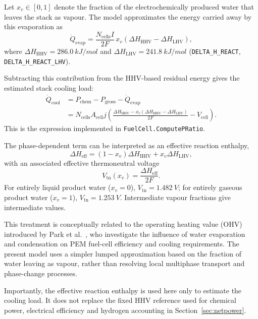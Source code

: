 \documentclass[a4paper,11pt]{article}
\newcommand{\code}[1]{\nolinkurl{#1}}
\newcommand{\fn}[1]{\nolinkurl{#1}}
\begin{document}
Let $x_v\in[0,1]$ denote the fraction of the electrochemically
produced water that leaves the stack as vapour. The model approximates
the energy carried away by this evaporation as
\begin{equation}
  \dot Q_\mathrm{evap}
  = \frac{N_\mathrm{cells}I}{2F}\,x_v
    \left(\Delta H_\mathrm{HHV}-\Delta H_\mathrm{LHV}\right),
\end{equation}
where $\Delta H_\mathrm{HHV}=\SI{286.0}{kJ/mol}$ and
$\Delta H_\mathrm{LHV}=\SI{241.8}{kJ/mol}$
(\code{DELTA_H_REACT}, \code{DELTA_H_REACT_LHV}).

Subtracting this contribution from the HHV-based residual energy
gives the estimated stack cooling load:
\begin{equation}
  \begin{aligned}
    \dot Q_\mathrm{cool}
    &= P_\mathrm{chem}-P_\mathrm{gross}-\dot Q_\mathrm{evap} \\
    &= N_\mathrm{cells} A_\mathrm{cell} j
    \left(
      \frac{\Delta H_\mathrm{HHV}
        -x_v(\Delta H_\mathrm{HHV}-\Delta H_\mathrm{LHV})}{2F}
      -V_\mathrm{cell}
    \right).
  \end{aligned}
  \label{eq:qcool}
\end{equation}
This is the expression implemented in \fn{FuelCell.ComputePRatio}.

The phase-dependent term can be interpreted as an effective
reaction enthalpy,
\begin{equation}
  \Delta H_\mathrm{eff}
  = (1-x_v)\Delta H_\mathrm{HHV}
    +x_v\Delta H_\mathrm{LHV},
\end{equation}
with an associated effective thermoneutral voltage
\begin{equation}
  V_\mathrm{tn}(x_v)=\frac{\Delta H_\mathrm{eff}}{2F}.
\end{equation}
For entirely liquid product water ($x_v=0$),
$V_\mathrm{tn}=\SI{1.482}{V}$; for entirely gaseous product water
($x_v=1$), $V_\mathrm{tn}=\SI{1.253}{V}$.
Intermediate vapour fractions give intermediate values.

This treatment is conceptually related to the operating heating
value (OHV) introduced by Park et al.~\cite{park2025ohv}, who
investigate the influence of water evaporation and condensation
on PEM fuel-cell efficiency and cooling requirements. The present
model uses a simpler lumped approximation based on the fraction
of water leaving as vapour, rather than resolving local multiphase
transport and phase-change processes.

Importantly, the effective reaction enthalpy is used here only
to estimate the cooling load. It does not replace the fixed HHV
reference used for chemical power, electrical efficiency and
hydrogen accounting in Section~\ref{sec:netpower}.
\end{document}
